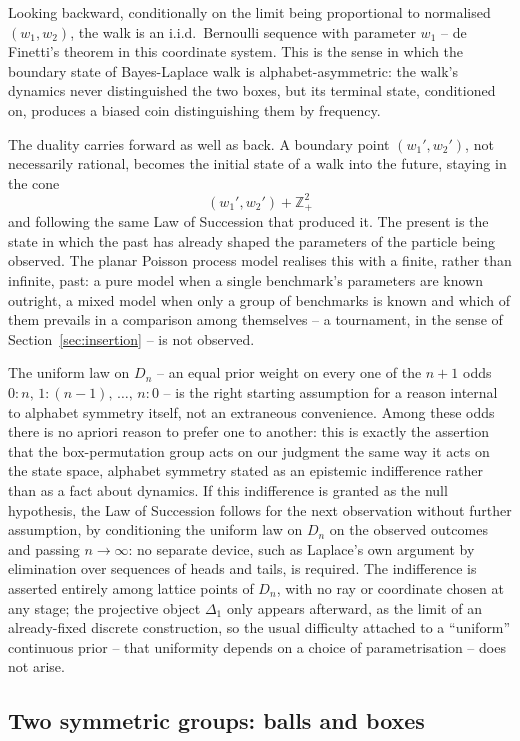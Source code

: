 \documentclass[11pt]{article}
\newcommand{\ZZ}{\mathbb{Z}}
\theoremstyle{plain}
\theoremstyle{definition}
\begin{document}
Looking backward, conditionally on the limit being proportional to normalised \((w_1,w_2)\), the walk is an i.i.d.\ Bernoulli sequence with parameter $w_1$ -- de Finetti's theorem in this coordinate system. This is the sense in which the boundary state of Bayes-Laplace walk is alphabet-asymmetric: the walk's dynamics never distinguished the two boxes, but its terminal state, conditioned on, produces a biased coin distinguishing them by frequency.

The duality carries forward as well as back. A boundary point \((w_1',w_2')\), not necessarily rational, becomes the initial state of a walk into the future, staying in the cone 
$$(w_1',w_2')+\ZZ_+^2$$ and following the same Law of Succession that produced it. The present is the state in which the past has already shaped the parameters of the particle being observed. The planar Poisson process model realises this with a finite, rather than infinite, past: a pure model when a single benchmark's parameters are known outright, a mixed model when only a group of benchmarks is known and which of them prevails in a comparison among themselves -- a tournament, in the sense of Section~\ref{sec:insertion} -- is not observed.

The uniform law on \(D_n\) -- an equal prior weight on every one of the \(n+1\) odds \(0:n,\,1:(n-1),\,\dots,\,n:0\) -- is the right starting assumption for a reason internal to alphabet symmetry itself, not an extraneous convenience. Among these odds there is no apriori reason to prefer one to another: this is exactly the assertion that the box-permutation group acts on our judgment the same way it acts on the state space, alphabet symmetry stated as an epistemic indifference rather than as a fact about dynamics. If this indifference is granted as the null hypothesis, the Law of Succession follows for the next observation without further assumption, by conditioning the uniform law on \(D_n\) on the observed outcomes and passing \(n\to\infty\): no separate device, such as Laplace's own argument by elimination over sequences of heads and tails, is required. The indifference is asserted entirely among lattice points of \(D_n\), with no ray or coordinate chosen at any stage; the projective object \(\Delta_1\) only appears afterward, as the limit of an already-fixed discrete construction, so the usual difficulty attached to a ``uniform'' continuous prior -- that uniformity depends on a choice of parametrisation -- does not arise.
\subsection{Two symmetric groups: balls and boxes}
\end{document}

